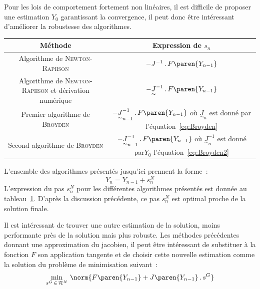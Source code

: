 \documentclass[rectoverso,pleiades,pstricks,leqno,anti]{texmf/note_technique_2010}
\begin{document}
Pour les lois de comportement fortement non linéaires, il est difficile
de proposer une estimation \(Y_{0}\) garantissant la convergence,
il peut donc être intéressant d'améliorer la robustesse des algorithmes.

\begin{table}
  \centering
  \begin{tabular}{|c|c|}
    \hline
    Méthode & Expression de \(s_{n}\) \\
    \hline
    \hline
    Algorithme de \textsc{Newton-Raphson}
    & \(-J^{-1}\,.\,F\paren{Y_{n-1}}\) \\
    \hline
    \begin{minipage}{7cm}
      Algorithme de \textsc{Newton-Raphson} et dérivation numérique
    \end{minipage} &
    \(-\underset{\sim}{J}^{-1}\,.\,F\paren{Y_{n-1}}\) \\
    \hline
    Premier algorithme de \textsc{Broyden} &
    \begin{minipage}{5cm}
      \(-\underset{\sim}{J}_{n-1}^{-1}\,.\,F\paren{Y_{n-1}}\)
      où \(\underset{\sim}{J}_{n}\) est donné par
      l'équation~\eqref{eq:Broyden}
    \end{minipage} \\
    \hline
    Second algorithme de \textsc{Broyden} &
    \begin{minipage}{5cm}
      \(-\underset{\sim}{J}_{n-1}^{-1}\,.\,F\paren{Y_{n-1}}\)
      où \(\underset{\sim}{J}_{n}^{-1}\) est donné par\(Y_{0}\)
      l'équation~\eqref{eq:Broyden2}
    \end{minipage} \\
    \hline
  \end{tabular}
  \label{tab:sn}
\end{table}

L'ensemble des algorithmes présentés jusqu'ici prennent la forme~:
\[
Y_{n}=Y_{n-1}+s^{N}_{n}
\]
L'expression du pas \(s^{N}_{n}\) pour les différentes algorithmes
présentés est donnée au tableau~\ref{tab:sn}. D'après la discussion
précédente, ce pas \(s^{N}_{n}\) est optimal proche de la solution
finale.

Il est intéressant de trouver une autre estimation de la solution, moins
performante près de la solution mais plus robuste. Les méthodes
précédentes donnant une approximation du jacobien, il peut être
intéressant de substituer à la fonction \(F\) son application tangente
et de choisir cette nouvelle estimation comme la solution du problème de
minimisation suivant~:
\[
\min_{s^{G}\,\in\,\mathcal{R}^{N}}\,\norm{F\paren{Y_{n-1}}+J\paren{Y_{n-1}}\,.\,s^{G}}
\]
\end{document}
